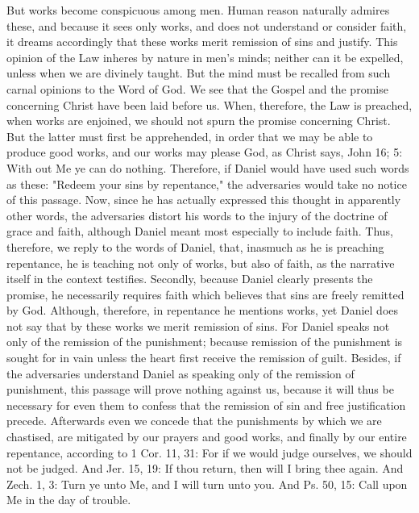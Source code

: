 But works become conspicuous among men.  Human reason naturally
admires these, and because it sees only works, and does not
understand or consider faith, it dreams accordingly that these works
merit remission of sins and justify.  This opinion of the Law inheres
by nature in men's minds; neither can it be expelled, unless when we
are divinely taught.  But the mind must be recalled from such carnal
opinions to the Word of God.  We see that the Gospel and the promise
concerning Christ have been laid before us.  When, therefore, the Law
is preached, when works are enjoined, we should not spurn the promise
concerning Christ.  But the latter must first be apprehended, in
order that we may be able to produce good works, and our works may
please God, as Christ says, John 16; 5: With out Me ye can do nothing.
Therefore, if Daniel would have used such words as these: "Redeem
your sins by repentance," the adversaries would take no notice of
this passage.  Now, since he has actually expressed this thought in
apparently other words, the adversaries distort his words to the
injury of the doctrine of grace and faith, although Daniel meant most
especially to include faith.  Thus, therefore, we reply to the words
of Daniel, that, inasmuch as he is preaching repentance, he is
teaching not only of works, but also of faith, as the narrative
itself in the context testifies.  Secondly, because Daniel clearly
presents the promise, he necessarily requires faith which believes
that sins are freely remitted by God.  Although, therefore, in
repentance he mentions works, yet Daniel does not say that by these
works we merit remission of sins.  For Daniel speaks not only of the
remission of the punishment; because remission of the punishment is
sought for in vain unless the heart first receive the remission of
guilt.  Besides, if the adversaries understand Daniel as speaking
only of the remission of punishment, this passage will prove nothing
against us, because it will thus be necessary for even them to
confess that the remission of sin and free justification precede.
Afterwards even we concede that the punishments by which we are
chastised, are mitigated by our prayers and good works, and finally
by our entire repentance, according to 1 Cor. 11, 31: For if we would
judge ourselves, we should not be judged.  And Jer. 15, 19: If thou
return, then will I bring thee again.  And Zech. 1, 3: Turn ye unto
Me, and I will turn unto you.  And Ps. 50, 15: Call upon Me in the
day of trouble.

